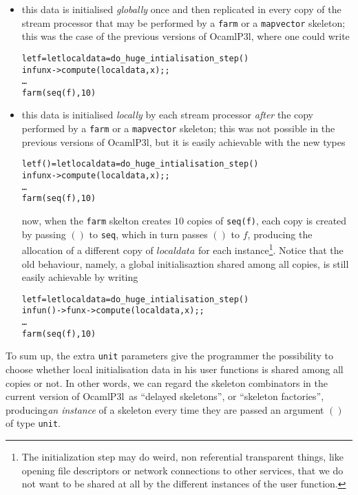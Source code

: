 \documentclass{article}
\newcommand{\ocamlpiiil}{{\sf OcamlP3l}}
\begin{document}
\begin{itemize}
  \item this data is initialised \emph{globally} once and then replicated in every copy of the stream processor that
        may be performed by a \verb|farm| or a \verb|mapvector| skeleton; this was the case of
	the previous versions of \ocamlpiiil, where one could write
\begin{alltt}
let f = let localdata = do_huge_intialisation_step ()
        in fun x -> compute (localdata,x);;
\ldots{}
farm(seq(f),10)
\end{alltt}
%
  \item this data is initialised \emph{locally} by each stream processor \emph{after} the
        copy performed by a \verb|farm| or a \verb|mapvector| skeleton; this was not possible
        in the previous versions of \ocamlpiiil, but it is easily achievable with the new types
%
\begin{alltt}
let f () = let localdata = do_huge_intialisation_step ()
           in fun x -> compute (localdata,x);;
\ldots{}
farm(seq(f),10)
\end{alltt}
%
        now, when the \verb|farm| skelton creates $10$ copies of \verb|seq(f)|, each copy is
        created by passing $()$ to \verb|seq|, which in turn passes $()$ to $f$, producing
        the allocation of a different copy of $localdata$ for each instance\footnote{The initialization step may do weird, non referential transparent things, like opening file descriptors or network connections to other services, that we
do not want to be shared at all by the different instances of the user function.}.
        Notice that the old behaviour, namely, a global initialisaztion shared among all copies, is
        still easily achievable by writing
%
\begin{alltt}
let f = let localdata = do_huge_intialisation_step ()
        in fun () -> fun x -> compute (localdata,x);;
\ldots{}
farm(seq(f),10)
\end{alltt}
%
\end{itemize}

To sum up, the extra \verb|unit| parameters give the programmer the possibility to choose whether local
initialisation data in his user functions is shared among all copies or not. In other words, we can regard
the skeleton combinators in the current version of \ocamlpiiil\ as ``delayed skeletons'', or ``skeleton factories'',
producing\emph{an instance} of a skeleton every time they are passed an argument $()$ of type \verb|unit|.
\end{document}
